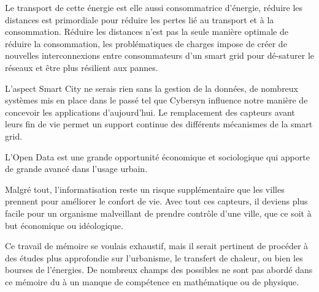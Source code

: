 Le transport de cette énergie est elle aussi consommatrice d'énergie, réduire les distances est primordiale
pour réduire les pertes lié au transport et à la consommation.
Réduire les distances n'est pas la seule manière optimale de réduire la consommation,
les problématiques de charges impose de créer de nouvelles interconnexions entre consommateurs
d'un smart grid pour dé-saturer le réseaux et être plus résilient aux pannes.

L'aspect Smart City ne serais rien sans la gestion de la données, de nombreux systèmes mis en place
dans le passé tel que Cybersyn influence notre manière de concevoir les applications d'aujourd'hui.
Le remplacement des capteurs avant leurs fin de vie permet un support continue des différents
mécanismes de la smart grid.

L'Open Data est une grande opportunité économique et sociologique qui apporte de grande avancé
dans l'usage urbain.

Malgré tout, l'informatisation reste un risque supplémentaire que les villes prennent pour améliorer le confort de vie.
Avec tout ces capteurs, il deviens plus facile pour un organisme malveillant de prendre contrôle d'une ville,
que ce soit à but économique ou idéologique.

Ce travail de mémoire se voulais exhaustif, mais il serait pertinent de procéder à des études plus approfondie
sur l'urbanisme, le transfert de chaleur, ou bien les bourses de l'énergies.
De nombreux champs des possibles ne sont pas abordé dans ce mémoire du à un manque de compétence en
mathématique ou de physique.